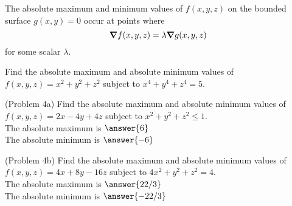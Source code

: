 \documentclass[handout]{ximera}
\begin{document}
\begin{theorem}
The absolute maximum and minimum values of $f(x,y, z)$ on the bounded surface $g(x,y) = 0$ occur at 
points where 
\[
\boldsymbol\nabla f(x,y, z) = \lambda \boldsymbol\nabla g(x,y, z)
\]
for some scalar $\lambda$.
\end{theorem}

\begin{example}[Example 4]
Find the absolute maximum and absolute minimum values of $f(x,y, z) = x^2 + y^2 + z^2$ subject to $x^4 + y^4 + z^4  = 5$.\\
\end{example}

\begin{problem}(Problem 4a)
Find the absolute maximum and absolute minimum values of $f(x,y, z) = 2x  -4y  +4z$ subject to $x^2 + y^2 + z^2 \leq 1$.\\
The absolute maximum is $\answer{6}$\\
The absolute minimum is $\answer{-6}$
\end{problem}

\begin{problem}(Problem 4b)
Find the absolute maximum and absolute minimum values of $f(x,y, z) = 4x + 8y - 16z$ subject to $4x^2 + y^2 + z^2 = 4$.\\
The absolute maximum is $\answer{22/3}$\\
The absolute minimum is $\answer{-22/3}$
\end{problem}
\end{document}
